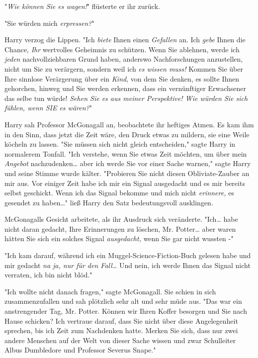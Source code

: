 {"\emph{Wie können Sie es wagen!}" flüsterte er ihr zurück.

"Sie würden mich \emph{erpressen?}"

Harry verzog die Lippen. "Ich \emph{biete} Ihnen einen \emph{Gefallen} an. Ich \emph{gebe} Ihnen die Chance, \emph{Ihr} wertvolles Geheimnis zu schützen. Wenn Sie ablehnen, werde ich \emph{jeden} nachvollziehbaren Grund haben, anderswo Nachforschungen anzustellen, nicht um Sie zu verärgern, sondern weil ich \emph{es wissen muss!} Kommen Sie über Ihre sinnlose Verärgerung über ein \emph{Kind}, von dem Sie denken, es sollte Ihnen gehorchen, hinweg und Sie werden erkennen, dass ein vernünftiger Erwachsener das selbe tun würde! \emph{Sehen Sie es aus meiner Perspektive! Wie würden Sie sich fühlen, wenn SIE es wären?}"

Harry sah Professor McGonagall an, beobachtete ihr heftiges Atmen. Es kam ihm in den Sinn, dass jetzt die Zeit wäre, den Druck etwas zu mildern, sie eine Weile köcheln zu lassen. "Sie müssen sich nicht gleich entscheiden," sagte Harry in normalerem Tonfall. "Ich verstehe, wenn Sie etwas Zeit möchten, um über mein \emph{Angebot} nachzudenken… aber ich werde Sie vor einer Sache warnen," sagte Harry und seine Stimme wurde kälter. "Probieren Sie nicht diesen Obliviate-Zauber an mir aus. Vor einiger Zeit habe ich mir ein Signal ausgedacht und es mir bereits selbst geschickt. Wenn ich das Signal bekomme und mich nicht \emph{erinnere,} es gesendet zu haben…" ließ Harry den Satz bedeutungsvoll ausklingen.

McGonagalls Gesicht arbeitete, als ihr Ausdruck sich veränderte. "Ich… habe nicht daran gedacht, Ihre Erinnerungen zu löschen, Mr. Potter… aber waren hätten Sie sich ein solches Signal \emph{ausgedacht,} wenn Sie gar nicht wussten -"

"Ich kam darauf, während ich ein Muggel-Science-Fiction-Buch gelesen habe und mir gedacht \emph{na ja, nur für den Fall…} Und nein, ich werde Ihnen das Signal nicht verraten, ich bin nicht blöd."

"Ich wollte nicht danach fragen," sagte McGonagall. Sie schien in sich zusammenzufallen und sah plötzlich sehr alt und sehr müde aus. "Das war ein anstrengender Tag, Mr. Potter. Können wir Ihren Koffer besorgen und Sie nach Hause schicken? Ich vertraue darauf, dass Sie nicht über diese Angelegenheit sprechen, bis ich Zeit zum Nachdenken hatte. Merken Sie sich, dass nur zwei andere Menschen auf der Welt von dieser Sache wissen und zwar Schulleiter Albus Dumbledore und Professor Severus Snape."

}
